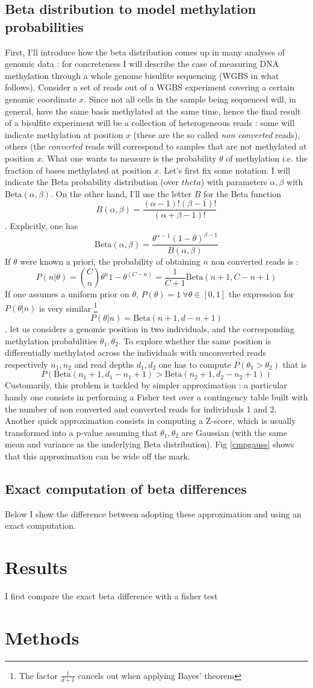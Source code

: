 \documentclass{amsart}
\begin{document}
\subsection{Beta distribution to model methylation probabilities}
First, I'll introduce how the beta distribution comes up in many analyses of genomic data : for concreteness I will describe the case of measuring DNA methylation through a whole genome bisulfite sequencing (WGBS in what follows). 
Consider a set of reads out of a WGBS experiment covering a certain genomic coordinate $x$. Since not all cells in the sample being sequenced will, in general,  have the same basis methylated at the same time, hence the final result of a bisulfite experiment will be a collection of heterogeneous reads : some will indicate methylation at position $x$ (these are the so called {\em non converted} reads), others (the {\em converted} reads will correspond to samples that are not methylated at position $x$. What one wants to measure is the probability $\theta$ of methylation i.e. the fraction of bases methylated at position $x$. Let's first fix some notation. I will indicate the Beta probability distribution (over $theta$) with parameters $\alpha,\beta$ with $\mbox{Beta}(\alpha,\beta)$. On the other hand, I'll use the letter $B$ for the Beta function 
\[B(\alpha,\beta)=\frac{(\alpha-1)!(\beta-1)!}{(\alpha+\beta-1)!}\]. Explicitly, one has \[\mbox{Beta}(\alpha,\beta)=\frac{\theta^{\alpha-1}(1-\theta)^{\beta-1}}{B(\alpha,\beta)}\] If $\theta$ were known a priori, the probability of obtaining $n$ non converted reads is :
\[P(n|\theta)={C \choose n}\theta^n {1-\theta}^(C-n)=\frac{1}{C+1}\mbox{Beta}(n+1,C-n+1)\]
If one assumes a uniform prior on $\theta$, $P(\theta)=1 \ \forall \theta \in [0,1]$ the expression for $P(\theta|n)$ is very similar \footnote{The factor $\frac{1}{d+1}$ cancels out when applying Bayes' theorem}
\[P(\theta|n)=\mbox{Beta}(n+1,d-n+1)\].
let us considers a genomic position in two individuals, and the corresponding methylation probabilities $\theta_1,\theta_2$. 
To explore whether the same position is differentially methylated across the individuals with unconverted reads respectively $n_1,n_2$ and read depths $d_1,d_2$ one
has to compute $P(\theta_1>\theta_2)$ that is \[P(\mbox{Beta}(n_1+1,d_1-n_1+1)>\mbox{Beta}(n_2+1,d_2-n_2+1))\] 
Customarily, this problem is tackled by simpler approximation : a particular handy one consists in performing a Fisher test over a contingency table built with the number of non converted and converted reads for individuals 1 and 2. Another quick approximation consists in computing a Z-score, which is usually transformed into a p-value assuming that $\theta_1,\theta_2$ are Gaussian (with the same mean and variance as the underlying Beta distribution).  Fig \ref{cmpgauss} shows that this approximation can be wide off the mark.
\subsection{Exact computation of beta differences}


Below I show the difference between adopting these approximation and using an exact computation.
\section{Results} 
I first compare the exact beta difference with a fisher test
\section{Methods}
\end{document}
